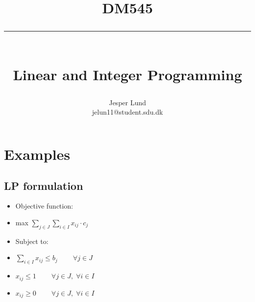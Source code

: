 \documentclass[a4paper,10pt,titlepage]{article}
\title{DM545\\\rule{10cm}{0.5mm}\\Linear and Integer Programming}
\author{Jesper Lund\\jelun11@student.sdu.dk}
\begin{document}
\newcommand{\IS}{:}
\newcommand{\OR}{$|$}
\newcommand{\T}[1]{{\bf #1}}
\newcommand{\NT}[1]{$\langle$#1$\rangle$}


\begin{titlepage}
  \maketitle
\end{titlepage}

\pagestyle{compiler}

\tableofcontents
\newpage

\section{Examples}

\subsection{LP formulation}

\begin{itemize}

\item[]Objective function:

\item[]max $\sum\limits_{j\in J} \sum\limits_{i\in I} x_{ij}\cdot c_{j}$

\item[]Subject to:

\item[]$\sum\limits_{i\in I} x_{ij} \leq b_j \;\;\;\;\;\;\;\; \forall j\in J$

\item[]$x_{ij}\leq 1 \;\;\;\;\;\;\;\; \forall j\in J,\; \forall i\in I$

\item[]$ x_{ij}\geq 0 \;\;\;\;\;\;\;\; \forall j\in J,\; \forall i\in I$

\end{itemize}
\end{document}
